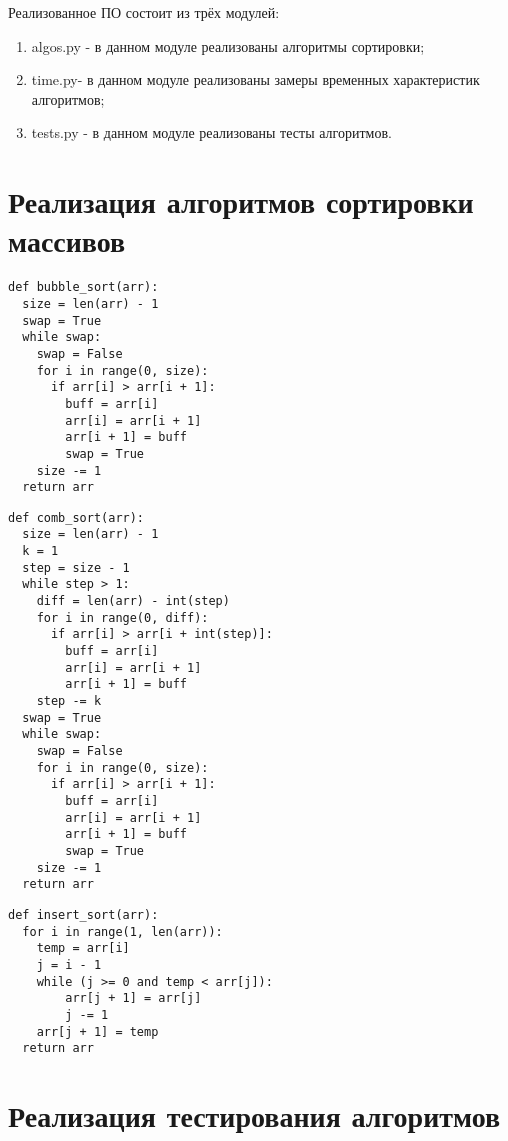 Реализованное ПО состоит из трёх модулей:
\begin{enumerate}
	\item algos.py - в данном модуле реализованы алгоритмы сортировки;
	\item time.py- в данном модуле реализованы замеры временных характеристик алгоритмов;
	\item tests.py - в данном модуле реализованы тесты алгоритмов.
\end{enumerate}

\section{Реализация алгоритмов сортировки массивов}

\begin{lstlisting}[label=some-code-1,caption=Реализация алгоритма сортировки ''пузырьком'']
def bubble_sort(arr):
  size = len(arr) - 1
  swap = True
  while swap:
    swap = False
    for i in range(0, size):
      if arr[i] > arr[i + 1]:
        buff = arr[i]
        arr[i] = arr[i + 1]
        arr[i + 1] = buff
        swap = True
    size -= 1
  return arr
\end{lstlisting}


\begin{lstlisting}[label=some-code-1,caption=Реализация алгоритма сортировки ''расчёской'']
def comb_sort(arr):
  size = len(arr) - 1
  k = 1
  step = size - 1
  while step > 1:
    diff = len(arr) - int(step)
    for i in range(0, diff):
      if arr[i] > arr[i + int(step)]:
        buff = arr[i]
        arr[i] = arr[i + 1]
        arr[i + 1] = buff
    step -= k
  swap = True
  while swap:
    swap = False
    for i in range(0, size):
      if arr[i] > arr[i + 1]:
        buff = arr[i]
        arr[i] = arr[i + 1]
        arr[i + 1] = buff
        swap = True
    size -= 1
  return arr 	
\end{lstlisting}

\begin{lstlisting}[label=some-code-1,caption=Реализация алгоритма сортировки вставками]
def insert_sort(arr):
  for i in range(1, len(arr)):
    temp = arr[i]
    j = i - 1
    while (j >= 0 and temp < arr[j]):
        arr[j + 1] = arr[j]
        j -= 1
    arr[j + 1] = temp
  return arr
\end{lstlisting}


\section{Реализация тестирования алгоритмов}

